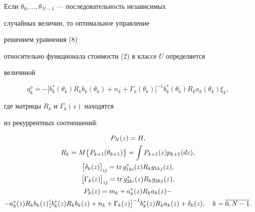 \begin{cor}


Если $\theta_{0},\dotsc,\theta_{N-1}$ --- последовательность независимых


случайных величин, то оптимальное управление


решением уравнения (8)


относительно функционала стоимости (2) в классе $U$ определяется


величиной


$$


\eta_{k}^{o}=-\bigl[b_{k}^{*}(\theta_{k})R_{k}


b_{k}(\theta_{k})+n_{k}+


\Gamma_{k}(\theta_{k})\bigr]^{-1}


b_{k}^{*}(\theta_{k})R_{k}a_{k}(\theta_{k})\xi_{k},


$$


где матрицы $R_{k}$ и $\Gamma_{k}(z)$ находятся


из рекуррентных соотношений:


\begin{gather*}


P_{N}(z)=H,\\


%


R_{k}=M\bigl\{P_{k+1}(\theta_{k+1})\bigr\}=


\int P_{k+1}(z)p_{k+1}(dz),\\


%


\bigl[\delta_{k}(z)\bigr]_{ij}=\tr g_{1ki}^{*}(z)R_{k}


g_{1kj}(z),\notag\\


%


\bigl[\Gamma_{k}(z)\bigr]_{ij}=\tr g_{2ki}^{*}(z)R_{k}


g_{2kj}(z),\\


%


P_{k}(z)=m_{k}+a_{k}^{*}(z)R_{k}a_{k}(z)-\\


%


-a_{k}^{*}(z)R_{k}


b_{k}(z)\bigl[b_{k}^{*}(z)R_{k}


b_{k}(z)+n_{k}+\Gamma_{k}(z)\bigr]^{-1}


b_{k}^{*}(z)R_{k}


a_{k}(z)+\delta_{k}(z),\quad k=\overline{0,N-1}.


\end{gather*}


\end{cor}








